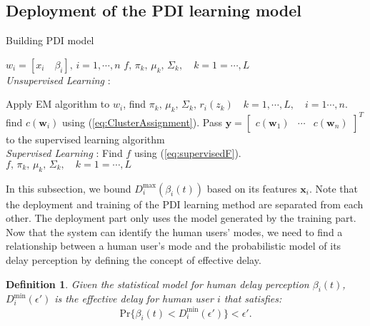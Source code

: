 \documentclass[journal,draftclsnofoot,onecolumn,12pt]{IEEEtran}%
\newtheorem{definition}{\bf Definition}
\newcommand{\xb}{\boldsymbol{x}}
\newcommand{\yb}{\boldsymbol{y}}
\newcommand{\wb}{\boldsymbol{w}}
\begin{document}
\subsection{{Deployment of the PDI learning model}}
\setlength{\textfloatsep}{0pt}%
\begin{algorithm}[!t]
 \caption{{Building PDI model}}
 {
 \begin{algorithmic}[1]
 \renewcommand{\algorithmicrequire}{\textbf{Input:}}
 \renewcommand{\algorithmicensure}{\textbf{Output:}}
 \REQUIRE $w_i=[x_i \quad\beta_i],\, i =1,\cdots,n$
 \ENSURE  $f,\, \pi_k,\, \mu_k,\, \Sigma_k, \quad k=1=\cdots,L$
 \\ {\textit{Unsupervised Learning}} :
  
  \STATE Apply EM algorithm to $w_i$, find $\pi_k,\, \mu_k,\, \Sigma_k,\, r_i(z_k)\quad  k=1,\cdots,L,\quad i=1 \cdots,n.$ 
  \STATE find $c(\wb_i)$ using (\ref{eq:ClusterAssignment}).
  \ENDFOR
  {\STATE Pass $\yb=\begin{bmatrix}
	c(\wb_1) & \cdots &c(\wb_n)
	\end{bmatrix}^T$ to the supervised learning algorithm
  \\ \textit{Supervised Learning} :
  \STATE Find $f$ using (\ref{eq:supervisedF}).}
 \RETURN $f,\, \pi_k,\, \mu_k,\, \Sigma_k, \quad k=1=\cdots,L$
 \end{algorithmic} }

 \end{algorithm}


	
	{In this subsection}, we bound $D_i^{\max}(\beta_i(t))$ based on its features $\xb_i$. {Note that the deployment and training of the PDI learning method are separated from each other. The deployment part only uses the model generated by the training part.} Now that the system can identify the human users' modes, we need to find a relationship between a human user's mode and the probabilistic model of its delay perception by defining the concept of effective delay.
	
	
	\begin{definition}
		Given the statistical model for human  delay perception $\beta_i(t)$, $D_i^{\min}(\epsilon')$ is the \emph{effective delay} for human user $i$ that satisfies: 
		\begin{equation}\label{eq:dminKia}
		\text{Pr}\big\{\beta_i(t)<D_i^{\min}(\epsilon')\big\}<\epsilon'.
		\end{equation}
	\end{definition}
	
\end{document}

